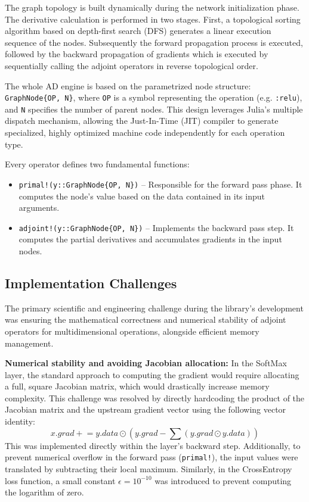 \documentclass[conference]{IEEEtran}
\begin{document}
The graph topology is built dynamically during the network initialization phase. The derivative calculation is performed in two stages. First, a topological sorting algorithm based on depth-first search (DFS) generates a linear execution sequence of the nodes. Subsequently the forward propagation process is executed, followed by the backward propagation of gradients which is executed by sequentially calling the adjoint operators in reverse topological order.

The whole AD engine is based on the parametrized node structure: \texttt{GraphNode\{OP, N\}}, where \texttt{OP} is a symbol representing the operation (e.g. \texttt{:relu}), and \texttt{N} specifies the number of parent nodes. This design leverages Julia's multiple dispatch mechanism, allowing the Just-In-Time (JIT) compiler to generate specialized, highly optimized machine code independently for each operation type.

Every operator defines two fundamental functions:
\begin{itemize}
    \item \texttt{primal!(y::GraphNode\{OP, N\})} -- Responsible for the forward pass phase. It computes the node's value based on the data contained in its input arguments.
    \item \texttt{adjoint!(y::GraphNode\{OP, N\})} -- Implements the backward pass step. It computes the partial derivatives and accumulates gradients in the input nodes.
\end{itemize}

\subsection{Implementation Challenges}
The primary scientific and engineering challenge during the library's development was ensuring the mathematical correctness and numerical stability of adjoint operators for multidimensional operations, alongside efficient memory management.

\textbf{Numerical stability and avoiding Jacobian allocation:} In the SoftMax layer, the standard approach to computing the gradient would require allocating a full, square Jacobian matrix, which would drastically increase memory complexity. This challenge was resolved by directly hardcoding the product of the Jacobian matrix and the upstream gradient vector using the following vector identity:
$$x.grad \mathrel{+}= y.data \odot (y.grad - \sum(y.grad \odot y.data))$$
This was implemented directly within the layer's backward step. Additionally, to prevent numerical overflow in the forward pass (\texttt{primal!}), the input values were translated by subtracting their local maximum. Similarly, in the CrossEntropy loss function, a small constant $\epsilon = 10^{-10}$ was introduced to prevent computing the logarithm of zero.
\end{document}
